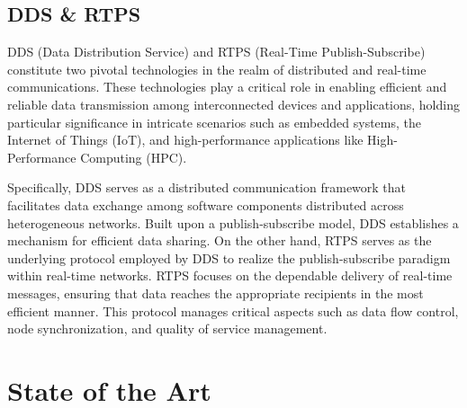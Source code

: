 
\subsection{DDS \& RTPS}

DDS (Data Distribution Service) and RTPS (Real-Time Publish-Subscribe) constitute two pivotal technologies in the realm of distributed and real-time communications. These technologies play a critical role in enabling efficient and reliable data transmission among interconnected devices and applications, holding particular significance in intricate scenarios such as embedded systems, the Internet of Things (IoT), and high-performance applications like High-Performance Computing (HPC).

Specifically, DDS serves as a distributed communication framework that facilitates data exchange among software components distributed across heterogeneous networks. Built upon a publish-subscribe model, DDS establishes a mechanism for efficient data sharing. On the other hand, RTPS serves as the underlying protocol employed by DDS to realize the publish-subscribe paradigm within real-time networks. RTPS focuses on the dependable delivery of real-time messages, ensuring that data reaches the appropriate recipients in the most efficient manner. This protocol manages critical aspects such as data flow control, node synchronization, and quality of service management.

\section{State of the Art} \label{SEC:soa}


